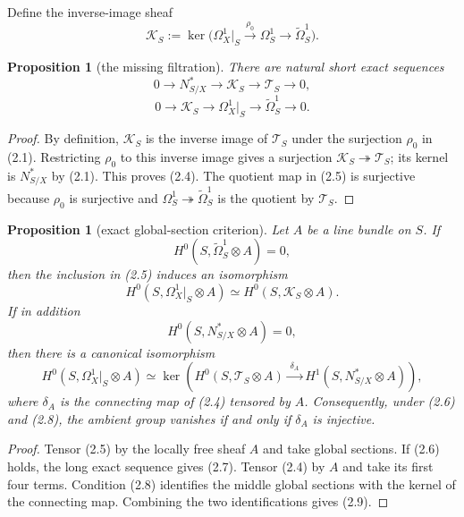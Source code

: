 \documentclass[11pt]{amsart}
\theoremstyle{plain}
\newtheorem{proposition}[theorem]{Proposition}
\theoremstyle{definition}
\theoremstyle{remark}
\begin{document}
Define the inverse-image sheaf
\[
 \mathscr K_S:=\ker\bigl(\Omega^1_X|_S\xrightarrow{\rho_0}
 \Omega^1_S\longrightarrow\widetilde\Omega^1_S\bigr).
 \tag{2.3}
\]

\begin{proposition}[the missing filtration]
\label{prop:filtration}
There are natural short exact sequences
\[
0\longrightarrow N^*_{S/X}\longrightarrow\mathscr K_S
\longrightarrow\mathscr T_S\longrightarrow0,
\tag{2.4}
\]
\[
0\longrightarrow\mathscr K_S\longrightarrow\Omega^1_X|_S
\longrightarrow\widetilde\Omega^1_S\longrightarrow0.
\tag{2.5}
\]
\end{proposition}

\begin{proof}
By definition, $\mathscr K_S$ is the inverse image of $\mathscr T_S$ under
the surjection $\rho_0$ in (2.1).  Restricting $\rho_0$ to this inverse
image gives a surjection $\mathscr K_S\twoheadrightarrow\mathscr T_S$;
its kernel is $N^*_{S/X}$ by (2.1).  This proves (2.4).  The quotient map
in (2.5) is surjective because $\rho_0$ is surjective and
$\Omega^1_S\twoheadrightarrow\widetilde\Omega^1_S$ is the quotient by
$\mathscr T_S$.
\end{proof}

\begin{proposition}[exact global-section criterion]
\label{prop:criterion}
Let $A$ be a line bundle on $S$.  If
\[
 H^0(S,\widetilde\Omega^1_S\otimes A)=0,
 \tag{2.6}
\]
then the inclusion in (2.5) induces an isomorphism
\[
 H^0(S,\Omega^1_X|_S\otimes A)
 \simeq H^0(S,\mathscr K_S\otimes A).
 \tag{2.7}
\]
If in addition
\[
 H^0(S,N^*_{S/X}\otimes A)=0,
 \tag{2.8}
\]
then there is a canonical isomorphism
\[
 H^0(S,\Omega^1_X|_S\otimes A)
 \simeq \ker\!\left(
 H^0(S,\mathscr T_S\otimes A)
 \xrightarrow{\;\delta_A\;}
 H^1(S,N^*_{S/X}\otimes A)
 \right),
 \tag{2.9}
\]
where $\delta_A$ is the connecting map of (2.4) tensored by $A$.
Consequently, under (2.6) and (2.8), the ambient group vanishes if and only
if $\delta_A$ is injective.
\end{proposition}

\begin{proof}
Tensor (2.5) by the locally free sheaf $A$ and take global sections.  If
(2.6) holds, the long exact sequence gives (2.7).  Tensor (2.4) by $A$ and
take its first four terms.  Condition (2.8) identifies the middle global
sections with the kernel of the connecting map.  Combining the two
identifications gives (2.9).
\end{proof}
\end{document}
